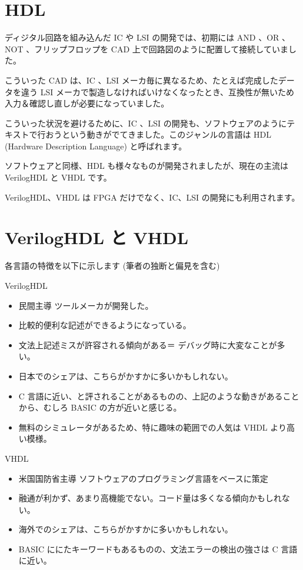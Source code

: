 \documentclass[letterpaper,10pt,dvipdfmx]{sphinxmanual}
\begin{document}
\section{HDL}
\label{\detokenize{03_fpga:hdl}}
ディジタル回路を組み込んだ IC や LSI の開発では、初期には AND 、OR 、NOT 、フリップフロップを CAD 上で回路図のように配置して接続していました。

こういった CAD は、IC 、LSI メーカ毎に異なるため、たとえば完成したデータを違う LSI メーカで製造しなければいけなくなったとき、互換性が無いため入力＆確認し直しが必要になっていました。

こういった状況を避けるために、IC 、LSI の開発も、ソフトウェアのようにテキストで行おうという動きがでてきました。このジャンルの言語は HDL  (Hardware Description Language) と呼ばれます。

ソフトウェアと同様、HDL も様々なものが開発されましたが、現在の主流は VerilogHDL と VHDL です。

VerilogHDL、VHDL は FPGA だけでなく、IC、LSI の開発にも利用されます。


\section{VerilogHDL と VHDL}
\label{\detokenize{03_fpga:veriloghdl-vhdl}}
各言語の特徴を以下に示します (筆者の独断と偏見を含む)

VerilogHDL
\begin{itemize}
\item {} 
民間主導\sphinxhyphen{} ツールメーカが開発した。

\item {} 
比較的便利な記述ができるようになっている。

\item {} 
文法上記述ミスが許容される傾向がある＝ デバッグ時に大変なことが多い。

\item {} 
日本でのシェアは、こちらがかすかに多いかもしれない。

\item {} 
C 言語に近い、と評されることがあるものの、上記のような動きがあることから、むしろ BASIC の方が近いと感じる。

\item {} 
無料のシミュレータがあるため、特に趣味の範囲での人気は VHDL より高い模様。

\end{itemize}

VHDL
\begin{itemize}
\item {} 
米国国防省主導\sphinxhyphen{} ソフトウェアのプログラミング言語をベースに策定

\item {} 
融通が利かず、あまり高機能でない。コード量は多くなる傾向かもしれない。

\item {} 
海外でのシェアは、こちらがかすかに多いかもしれない。

\item {} 
BASIC ににたキーワードもあるものの、文法エラーの検出の強さは C 言語に近い。

\end{itemize}
\end{document}

